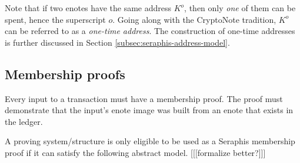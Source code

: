 Note that if two enotes have the same address $K^o$, then only {\em one} of them can be spent, hence the superscript $o$. Going along with the CryptoNote tradition, $K^o$ can be referred to as a {\em one-time address}. The construction of one-time addresses is further discussed in Section \ref{subsec:seraphis-address-model}.


\subsection{Membership proofs}
\label{subsec:seraphis-membership proofs}

Every input to a transaction must have a membership proof. The proof must demonstrate that the input's enote image was built from an enote that exists in the ledger.

A proving system/structure is only eligible to be used as a Seraphis membership proof if it can satisfy the following abstract model. [[[formalize better?]]]


